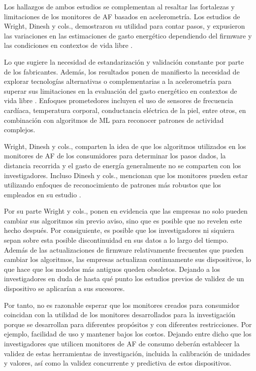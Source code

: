 Los hallazgos de ambos estudios se complementan al resaltar las fortalezas y limitaciones de los monitores de AF basados en acelerometría. Los estudios de Wright, Dinesh y cols., demostraron su utilidad para contar pasos, y expusieron las variaciones en las estimaciones de gasto energético dependiendo del firmware y las condiciones en contextos de vida libre \citep{Wright2017ConsumerMonitors,Dinesh2014ActiGraph}.

Lo que sugiere la necesidad de estandarización y validación constante por parte de los fabricantes. Además, los resultados ponen de manifiesto la necesidad de explorar tecnologías alternativas o complementarias a la acelerometría para superar sus limitaciones en la evaluación del gasto energético en contextos de vida libre \citep{Dinesh2014ActiGraph}. Enfoques prometedores incluyen el uso de sensores de frecuencia cardíaca, temperatura corporal, conductancia eléctrica de la piel, entre otros, en combinación con algoritmos de ML para reconocer patrones de actividad complejos.

Wright, Dinesh y cols., comparten la idea de que los algoritmos utilizados en los monitores de AF de los consumidores para determinar los pasos dados, la distancia recorrida y el gasto de energía generalmente no se comparten con los investigadores. Incluso Dinesh y cols., mencionan que los monitores pueden estar utilizando enfoques de reconocimiento de patrones más robustos que los empleados en su estudio \citep{Wright2017ConsumerMonitors,Dinesh2014ActiGraph}.

Por su parte Wright y cols., ponen en evidencia que las empresas no solo pueden cambiar sus algoritmos sin previo aviso, sino que es posible que no revelen este hecho después. Por consiguiente, es posible que los investigadores ni siquiera sepan sobre esta posible discontinuidad en sus datos a lo largo del tiempo. Además de las actualizaciones de firmware relativamente frecuentes que pueden cambiar los algoritmos, las empresas actualizan continuamente sus dispositivos, lo que hace que los modelos más antiguos queden obsoletos. Dejando a los investigadores en duda de hasta qué punto los estudios previos de validez de un dispositivo se aplicarían a sus sucesores.

Por tanto, no es razonable esperar que los monitores creados para consumidor coincidan con la utilidad de los monitores desarrollados para la investigación porque se desarrollan para diferentes propósitos y con diferentes restricciones. Por ejemplo, facilidad de uso y mantener bajos los costos. Dejando entre dicho que los investigadores que utilicen monitores de AF de consumo deberán establecer la validez de estas herramientas de investigación, incluida la calibración de unidades y valores, así como la validez concurrente y predictiva de estos dispositivos.


